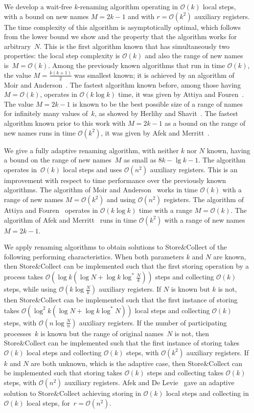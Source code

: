 \documentclass[11pt]{article}
\newcommand{\cO}{\mathcal{O}}
\begin{document}
We develop a wait-free $k$-renaming algorithm operating in $\cO(k)$ local steps, with a bound on new names $M=2k-1$ and with $r=\cO(k^2)$ auxiliary registers.
The time complexity of this algorithm is asymptotically optimal, which follows from the lower bound we show and the property that the algorithm works for arbitrary~$N$.
This is the first algorithm known that has simultaneously two properties: the local step complexity is $\cO(k)$ and also the range of new names is~$M=\cO(k)$.
Among the previously known algorithms that run in time $\cO(k)$, the value $M=\frac{k(k+1)}{2}$ was smallest known; it is achieved by an algorithm of Moir and Anderson~\cite{MoirA95}.
The fastest algorithm known before, among those having $M=\cO(k)$, operates in $\cO(k\log k)$ time, it was given by Attiya and Fouren~\cite{AttiyaF01}.
The value $M=2k-1$ is known to be the best possible size of a range of names for infinitely many values of~$k$, as showed by Herlihy and Shavit~\cite{HerlihyS99}. 
The fastest algorithm known prior to this work with $M=2k-1$ as a bound on the range of new names runs in time $\cO(k^2)$, it was given by Afek and Merritt~\cite{AfekM99}.


We give a fully adaptive  renaming algorithm, with neither $k$ nor $N$ known, having a bound on the range of new names~$M$ as small as $8k-\lg k-1$.
The algorithm operates in~$\cO(k)$ local steps and uses $\cO(n^2)$ auxiliary registers.
This is an improvement with respect to time performance over the previously known algorithms.
The algorithm of Moir and Anderson~\cite{MoirA95} works in time $\cO(k)$ with a range of new names $M=\cO(k^2)$ and using $\cO(n^2)$ registers.
The algorithm of Attiya and Fouren~\cite{AttiyaF01} operates in $\cO(k\log k)$ time with a range $M=\cO(k)$.
The algorithm of Afek and Merritt~\cite{AfekM99} runs in time $\cO(k^2)$ with a range of new names~$M=2k-1$.

We apply  renaming algorithms to obtain solutions to Store\&Collect of the following performing characteristics.
When both parameters $k$ and $N$ are known, then Store\&Collect can be implemented such that the first storing operation by a process takes  $\cO(\log k (\log N + \log k\log^* \frac{N}{k}))$ steps and collecting $\cO(k)$ steps, while using $\cO(k\log\frac{N}{k})$ auxiliary registers.
If $N$ is known but $k$ is not, then Store\&Collect can be implemented such that the first instance of storing takes $\cO(\log^2 k (\log N + \log k\log^\ast N))$ local steps and collecting $\cO(k)$ steps, with $\cO(n\log\frac{N}{n})$ auxiliary registers.
If the number of participating processes~$k$ is known but the range of original names~$N$ is not, then Store\&Collect can be implemented such that the first instance of storing takes $\cO(k)$ local steps and collecting $\cO(k)$ steps, with $\cO(k^2)$ auxiliary registers.
If $k$ and $N$ are both unknown, which is the adaptive case, then Store\&Collect can be implemented such that storing takes $\cO(k)$ steps and collecting takes $\cO(k)$ steps, with $\cO(n^2)$ auxiliary registers.
Afek and De Levie~\cite{AfekL07} gave an adaptive solution to Store\&Collect achieving storing in $\cO(k)$ local steps and collecting in $\cO(k)$ local steps, for~$r=\cO(n^2)$.
\end{document}
